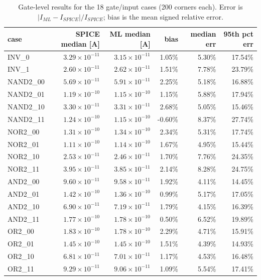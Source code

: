 \begin{table}[H]
\centering
{\small
\begin{tabular}{lrrrrr}
\toprule
case & SPICE median [A] & ML median [A] & bias & median err & 95th pct err \\
\midrule
INV\_0 & $3.29\times10^{-11}$ & $3.15\times10^{-11}$ & 1.05\% & 5.30\% & 17.54\% \\
INV\_1 & $2.60\times10^{-11}$ & $2.62\times10^{-11}$ & 1.51\% & 7.78\% & 23.79\% \\
NAND2\_00 & $5.69\times10^{-11}$ & $5.91\times10^{-11}$ & 2.25\% & 5.18\% & 16.88\% \\
NAND2\_01 & $1.19\times10^{-10}$ & $1.15\times10^{-10}$ & 1.15\% & 5.88\% & 17.94\% \\
NAND2\_10 & $3.30\times10^{-11}$ & $3.31\times10^{-11}$ & 2.68\% & 5.05\% & 15.46\% \\
NAND2\_11 & $1.24\times10^{-10}$ & $1.15\times10^{-10}$ & -0.60\% & 8.37\% & 27.74\% \\
NOR2\_00 & $1.31\times10^{-10}$ & $1.34\times10^{-10}$ & 2.34\% & 5.31\% & 17.74\% \\
NOR2\_01 & $1.11\times10^{-10}$ & $1.14\times10^{-10}$ & 1.67\% & 4.95\% & 15.44\% \\
NOR2\_10 & $2.53\times10^{-11}$ & $2.46\times10^{-11}$ & 1.70\% & 7.76\% & 24.35\% \\
NOR2\_11 & $3.95\times10^{-11}$ & $3.85\times10^{-11}$ & 2.14\% & 8.28\% & 24.75\% \\
AND2\_00 & $9.60\times10^{-11}$ & $9.58\times10^{-11}$ & 1.92\% & 4.11\% & 14.45\% \\
AND2\_01 & $1.42\times10^{-10}$ & $1.36\times10^{-10}$ & 0.99\% & 5.17\% & 17.05\% \\
AND2\_10 & $6.90\times10^{-11}$ & $7.19\times10^{-11}$ & 1.79\% & 4.15\% & 16.39\% \\
AND2\_11 & $1.77\times10^{-10}$ & $1.78\times10^{-10}$ & 0.50\% & 6.52\% & 19.89\% \\
OR2\_00 & $1.83\times10^{-10}$ & $1.78\times10^{-10}$ & 2.29\% & 4.71\% & 15.91\% \\
OR2\_01 & $1.45\times10^{-10}$ & $1.45\times10^{-10}$ & 1.51\% & 4.39\% & 14.93\% \\
OR2\_10 & $6.81\times10^{-11}$ & $7.01\times10^{-11}$ & 1.17\% & 4.53\% & 16.48\% \\
OR2\_11 & $9.29\times10^{-11}$ & $9.06\times10^{-11}$ & 1.09\% & 5.54\% & 17.41\% \\
\bottomrule
\end{tabular}
}
\caption{Gate-level results for the 18 gate/input cases (200 corners each). Error is $|I_{ML}-I_{SPICE}|/I_{SPICE}$; bias is the mean signed relative error.}
\label{tab:gates}
\end{table}

